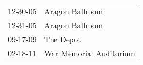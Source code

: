 \begin{supertabular}{p{0.25\columnwidth}p{0.75\columnwidth}}
 12-30-05 &          Aragon Ballroom \\
 12-31-05 &          Aragon Ballroom \\
 09-17-09 &                The Depot \\
 02-18-11 &  War Memorial Auditorium \\
\end{supertabular}
